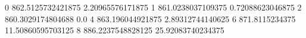 0 862.5125732421875 2.20965576171875
1 861.0238037109375 0.72088623046875
2 860.3029174804688 0.0
4 863.196044921875 2.89312744140625
6 871.8115234375 11.50860595703125
8 886.2237548828125 25.92083740234375
